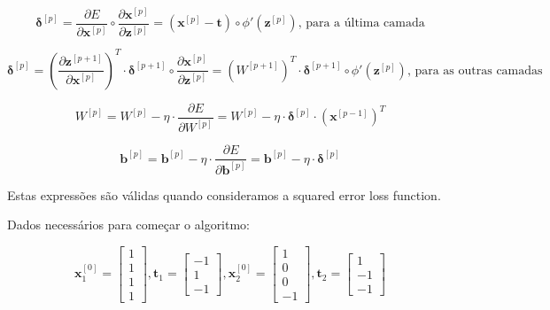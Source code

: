 \documentclass[a4paper,12pt]{article} %
\begin{document}
\begin{enumerate}
\begin{equation}
    \bm{\delta}^{[p]} = \frac{\partial E}{\partial \textbf{x}^{[p]}} \circ \frac{\partial \textbf{x}^{[p]}}{\partial \textbf{z}^{[p]}} = (\textbf{x}^{[p]} - \mathbf{t}) \circ \phi'(\mathbf{z}^{[p]}) \text{, para a última camada}
\end{equation}    

\begin{equation}
    \bm{\delta}^{[p]} = (\frac{\partial \textbf{z}^{[p+1]}}{\partial \textbf{x}^{[p]}})^T \cdot \bm{\delta}^{[p+1]} \circ \frac{\partial \textbf{x}^{[p]}}{\partial \textbf{z}^{[p]}} = ({W}^{[p+1]})^T \cdot \bm{\delta}^{[p+1]} \circ \phi'(\textbf{z}^{[p]}) \text{, para as outras camadas}
\end{equation}

\begin{equation}
    {W}^{[p]} = {W}^{[p]} - \eta \cdot \frac{\partial E}{\partial {W}^{[p]}} = {W}^{[p]} - \eta \cdot \bm{\delta}^{[p]} \cdot (\textbf{x}^{[p-1]})^T
\end{equation}

\begin{equation}
    \textbf{b}^{[p]} = \textbf{b}^{[p]} - \eta \cdot \frac{\partial E}{\partial \textbf{b}^{[p]}} = \textbf{b}^{[p]} - \eta \cdot \bm{\delta}^{[p]}
\end{equation}

Estas expressões são válidas quando consideramos a squared error loss function.

Dados necessários para começar o algoritmo:

\begin{equation*}
    \textbf{x}^{[0]}_1 = \begin{bmatrix} 1 \\ 1 \\ 1 \\ 1 \end{bmatrix} , \textbf{t}_1 = \begin{bmatrix} -1 \\ 1 \\ -1 \end{bmatrix} , \textbf{x}^{[0]}_2 = \begin{bmatrix} 1 \\ 0 \\ 0 \\ -1 \end{bmatrix} , \textbf{t}_2 = \begin{bmatrix} 1 \\ -1 \\ -1 \end{bmatrix}
\end{equation*}


\end{enumerate}
\end{document}
